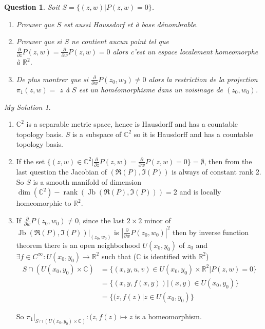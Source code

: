 \documentclass[]{article}
\newtheorem{prop}{Question}
\theoremstyle{remark}
\newtheorem*{sol}{My Solution}
\begin{document}
\begin{prop}
	Soit $S=\{(z, w) | P(z, w)=0\}$.
	\begin{enumerate}
		\item Prouver que $S$ est aussi Haussdorf et à base dénombrable. 
		\item Prouver que si $S$ ne contient aucun point tel que $\frac{\partial}{\partial z} P(z, w)=\frac{\partial}{\partial w} P(z, w)=0$ alors c'est un espace localement homeomorphe à $\mathbb{R}^{2}$. 
		\item De plus montrer que si $\frac{\partial}{\partial w} P\left(z_{0}, w_{0}\right) \neq 0$ alors la restriction de la projection $\pi_{1}(z, w)=$ $z$ à $S$ est un homéomorphisme dans un voisinage de $\left(z_{0}, w_{0}\right)$.
	\end{enumerate}
\end{prop}
\begin{sol}
	\begin{enumerate}
		\item $ \mathbb{C}^2 $ is a separable metric space, hence is Hausdorff and has a countable topology basis. $ S $ is a subspace of $ \mathbb{C}^2 $ so it is Hausdorff and has a countable topology basis.
		\item If the set $ \{(z,w)\in \mathbb{C}^2 |\frac{\partial}{\partial z} P(z, w)=\frac{\partial}{\partial w} P(z, w)=0\} = \emptyset $, then from the last question the Jacobian of $ (\Re(P), \Im(P)) $ is always of constant rank 2. So $ S $ is a smooth manifold of dimension $ \operatorname{dim}(\mathbb{C}^2) - \operatorname{rank}(\operatorname{Jb}(\Re(P), \Im(P))) =2 $ and is locally homeomorphic to $ \mathbb{R}^2 $.
		\item If $\frac{\partial}{\partial w} P\left(z_{0}, w_{0}\right) \neq 0$, since the last $ 2 \times 2 $ minor of  $ \left. \operatorname{Jb}\left( \Re(P), \Im(P) \right)\right| _{(z_{0}, w_{0})} $ is $ {\left| \frac{\partial}{\partial w}P(z_{0}, w_{0})\right| }^2 $ then by inverse function theorem there is an open neighborhood $ U(x_0, y_0) $ of $ z_0 $ and $ \exists f\in C^\infty: U(x_0, y_0) \rightarrow \mathbb{R}^2 $ such that ($ \mathbb{C} $ is identified with $ \mathbb{R}^2 $)
	\[ \begin{aligned}
			S\cap (U(x_0, y_0)\times \mathbb{C}) &= \{(x,y,u,v)\in  U(x_0, y_0) \times \mathbb{R}^2 |  P(z, w)=0 \} \\&= \{(x,y,f(x,y))| (x,y)\in U(x_0, y_0)\} \\&=
			\{(z,f(z)|z\in U(x_0, y_0) \}
	\end{aligned} \] 
		
		So $\left.  \pi_1 \right|_{S\cap (U(x_0, y_0)\times \mathbb{C})}: (z, f(z) \mapsto z$ is a homeomorphism.
	\end{enumerate}
\end{sol}
\end{document}
